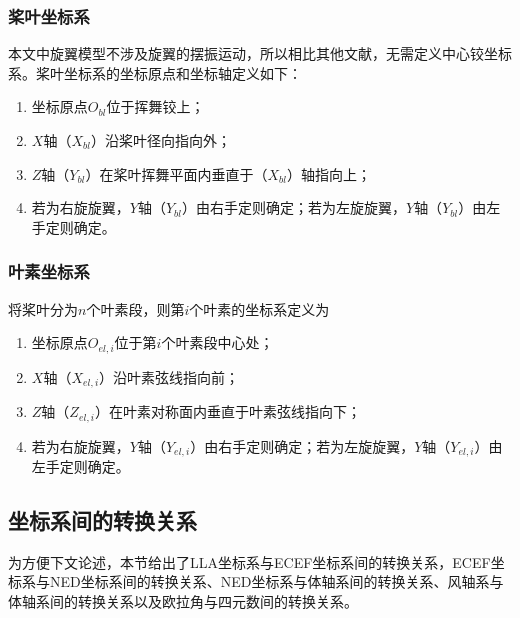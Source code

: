 \subsubsection{桨叶坐标系}
本文中旋翼模型不涉及旋翼的摆振运动，所以相比其他文献，无需定义中心铰坐标系。桨叶坐标系的坐标原点和坐标轴定义如下：
\begin{enumerate}
  \item 坐标原点$O_{bl}$位于挥舞铰上；
  \item $X$轴（$X_{bl}$）沿桨叶径向指向外；
  \item $Z$轴（$Y_{bl}$）在桨叶挥舞平面内垂直于（$X_{bl}$）轴指向上；
  \item 若为右旋旋翼，$Y$轴（$Y_{bl}$）由右手定则确定；若为左旋旋翼，$Y$轴（$Y_{bl}$）由左手定则确定。
\end{enumerate}
\subsubsection{叶素坐标系}
将桨叶分为$n$个叶素段，则第$i$个叶素的坐标系定义为
\begin{enumerate}
  \item 坐标原点$O_{el,i}$位于第$i$个叶素段中心处；
  \item $X$轴（$X_{el,i}$）沿叶素弦线指向前；
  \item $Z$轴（$Z_{el,i}$）在叶素对称面内垂直于叶素弦线指向下；
  \item 若为右旋旋翼，$Y$轴（$Y_{el,i}$）由右手定则确定；若为左旋旋翼，$Y$轴（$Y_{el,i}$）由左手定则确定。
\end{enumerate}
\subsection{坐标系间的转换关系}
为方便下文论述，本节给出了LLA坐标系与ECEF坐标系间的转换关系，ECEF坐标系与NED坐标系间的转换关系、NED坐标系与体轴系间的转换关系、风轴系与体轴系间的转换关系以及欧拉角与四元数间的转换关系。
